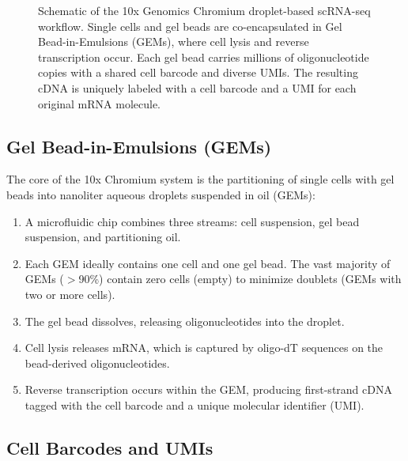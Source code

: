 \begin{figure}[htbp]
\caption{Schematic of the 10x Genomics Chromium droplet-based scRNA-seq
workflow. Single cells and gel beads are co-encapsulated in Gel Bead-in-Emulsions
(GEMs), where cell lysis and reverse transcription occur. Each gel bead carries
millions of oligonucleotide copies with a shared cell barcode and diverse UMIs.
The resulting cDNA is uniquely labeled with a cell barcode and a UMI for each
original mRNA molecule.}
\label{fig:scrnaseq:10x}
\end{figure}

\subsection{Gel Bead-in-Emulsions (GEMs)}

The core of the 10x Chromium system is the partitioning of single cells with
gel beads into nanoliter aqueous droplets suspended in oil (GEMs):

\begin{enumerate}[nosep]
  \item A microfluidic chip combines three streams: cell suspension, gel bead
    suspension, and partitioning oil.
  \item Each GEM ideally contains one cell and one gel bead. The vast majority
    of GEMs ($>$90\%) contain zero cells (empty) to minimize doublets (GEMs
    with two or more cells).
  \item The gel bead dissolves, releasing oligonucleotides into the droplet.
  \item Cell lysis releases mRNA, which is captured by oligo-dT sequences on
    the bead-derived oligonucleotides.
  \item Reverse transcription occurs within the GEM, producing first-strand
    cDNA tagged with the cell barcode and a unique molecular identifier (UMI).
\end{enumerate}

\subsection{Cell Barcodes and UMIs}

